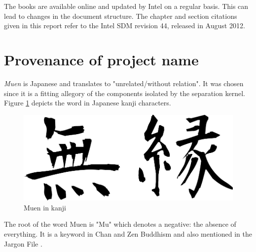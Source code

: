 The books are available online and updated by Intel on a regular basis. This
can lead to changes in the document structure. The chapter and section
citations given in this report refer to the Intel SDM revision 44, released in
August 2012.

\section{Provenance of project name}
\emph{Muen} is Japanese and translates to "unrelated/without relation". It was
chosen since it is a fitting allegory of the components isolated by the
separation kernel. Figure \ref{fig:muen} depicts the word in Japanese kanji
characters.

\begin{figure}[h]
	\centering
	\includegraphics[scale=0.4]{images/muen.pdf}
	\caption{Muen in kanji}
	\label{fig:muen}
\end{figure}

The root of the word Muen is "Mu" which denotes a negative: the absence of
everything. It is a keyword in Chan and Zen Buddhism and also mentioned in the
Jargon File \cite{jargonfile}.
